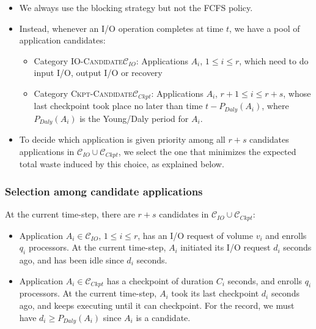 \documentclass[conference]{IEEEtran}
\newcommand{\period}[1]{P_{#1}}
\newcommand{\IOcat}{\textsc{IO-Candidate}\xspace}
\newcommand{\Ckptcat}{\textsc{Ckpt-Candidate}\xspace}
\newcommand{\Catiocat}{\mathcal{C}_{IO}\xspace}
\newcommand{\Catckptcat}{\mathcal{C}_{Ckpt}\xspace}
\begin{document}
\begin{itemize}
  \item We always use the blocking strategy but not the FCFS policy.
  \item Instead, whenever an I/O operation completes at time $t$, we have a pool of application candidates:
  \begin{itemize}
   \item Category \IOcat $\Catiocat$: Applications $A_{i}$, $1\leq i \leq r$, which need to do input I/O, output I/O or recovery
  \item Category \Ckptcat $\Catckptcat$: Applications $A_{i}$, $r+1\leq i \leq r+s$,
  whose last checkpoint took place no later than time $t - \period{Daly}(A_{i})$, where $\period{Daly}(A_{i})$ is the Young/Daly period for $A_{i}$.
  \end{itemize}
  \item To decide which application is given priority among all $r+s$ candidates applications in $\Catiocat \cup \Catckptcat$, we select the one that minimizes the expected total waste induced by this choice, as explained below.
  \end{itemize}

 \subsubsection{Selection among candidate applications}

At the current time-step, there are $r+s$ candidates in $\Catiocat \cup \Catckptcat$:
\begin{itemize}
  \item Application $A_{i} \in \Catiocat$, $1\leq i \leq r$,
  has an I/O request of volume $v_{i}$ and enrolls $q_{i}$ processors. At the current time-step, $A_{i}$ initiated its I/O request $d_{i}$ seconds ago, and has been idle since $d_{i}$ seconds.
 \item Application $A_{i} \in  \Catckptcat$ has a checkpoint of duration $C_{i}$ seconds,
  and enrolls $q_{i}$ processors. At the current time-step, $A_{i}$ took its last checkpoint
  $d_{i}$ seconds ago, and keeps executing until it can checkpoint. For the record, we must have $d_{i} \geq \period{Daly}(A_{i})$
  since $A_{i}$ is a candidate.
  \end{itemize}
\end{document}
